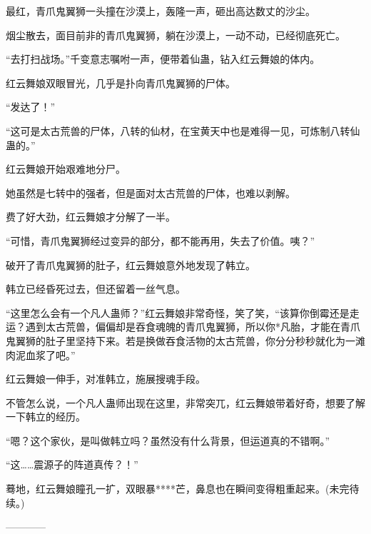 \begin{this_body}
最红，青爪鬼翼狮一头撞在沙漠上，轰隆一声，砸出高达数丈的沙尘。

烟尘散去，面目前非的青爪鬼翼狮，躺在沙漠上，一动不动，已经彻底死亡。

“去打扫战场。”千变意志嘱咐一声，便带着仙蛊，钻入红云舞娘的体内。

红云舞娘双眼冒光，几乎是扑向青爪鬼翼狮的尸体。

“发达了！”

“这可是太古荒兽的尸体，八转的仙材，在宝黄天中也是难得一见，可炼制八转仙蛊的。”

红云舞娘开始艰难地分尸。

她虽然是七转中的强者，但是面对太古荒兽的尸体，也难以剥解。

费了好大劲，红云舞娘才分解了一半。

“可惜，青爪鬼翼狮经过变异的部分，都不能再用，失去了价值。咦？”

破开了青爪鬼翼狮的肚子，红云舞娘意外地发现了韩立。

韩立已经昏死过去，但还留着一丝气息。

“这里怎么会有一个凡人蛊师？”红云舞娘非常奇怪，笑了笑，“该算你倒霉还是走运？遇到太古荒兽，偏偏却是吞食魂魄的青爪鬼翼狮，所以你*凡胎，才能在青爪鬼翼狮的肚子里坚持下来。若是换做吞食活物的太古荒兽，你分分秒秒就化为一滩肉泥血浆了吧。”

红云舞娘一伸手，对准韩立，施展搜魂手段。

不管怎么说，一个凡人蛊师出现在这里，非常突兀，红云舞娘带着好奇，想要了解一下韩立的经历。

“嗯？这个家伙，是叫做韩立吗？虽然没有什么背景，但运道真的不错啊。”

“这……震源子的阵道真传？！”

蓦地，红云舞娘瞳孔一扩，双眼暴****芒，鼻息也在瞬间变得粗重起来。(未完待续。)

------------

\end{this_body}

